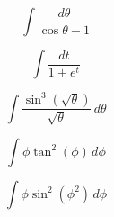 \documentclass[12pt, letterpaper]{article}
\begin{document}
$$ \int \frac{d\theta}{\cos{\theta} - 1} $$

\vspace*{0.7in}

$$ \int \frac{dt}{1 + e^t} $$

\vspace*{0.7in}

$$ \int \frac{\sin^3{\left( \sqrt{\theta} \right)}}{\sqrt{\theta}} \, d\theta $$

\vspace*{0.7in}

$$ \int \phi \tan^2{\left( \phi  \right)} \, d\phi $$

\vspace*{0.7in}

$$ \int \phi \sin^2{\left( \phi^2 \right)} \, d\phi $$
\end{document}
